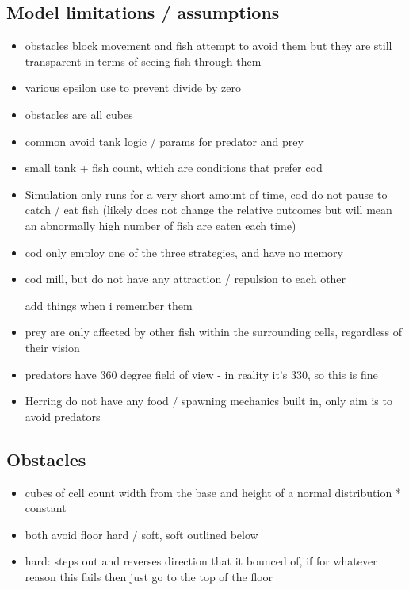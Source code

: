 \subsection{Model limitations / assumptions}
\begin{itemize}
\item obstacles block movement and fish attempt to avoid them but they are still transparent in terms of seeing fish through them
\item various epsilon use to prevent divide by zero
\item obstacles are all cubes
\item common avoid tank logic / params for predator and prey
\item small tank + fish count, which are conditions that prefer cod
\item Simulation only runs for a very short amount of time, cod do not pause to catch / eat fish (likely does not change the relative outcomes but will mean an abnormally high number of fish are eaten each time)
\item cod only employ one of the three strategies, and have no memory
\item cod mill, but do not have any attraction / repulsion to each other
\item [add things when i remember them]
\item prey are only affected by other fish within the surrounding cells, regardless of their vision
\item predators have 360 degree field of view - in reality it's 330, so this is fine
\item Herring do not have any food / spawning mechanics built in, only aim is to avoid predators
\end{itemize}
\subsection{Obstacles}
\begin{itemize}
\item cubes of cell count width from the base and height of a normal distribution * constant
\item both avoid floor hard / soft, soft outlined below
\item  hard: steps out and reverses direction that it bounced of, if for whatever reason this fails then just go to the top of the floor
\end{itemize}
